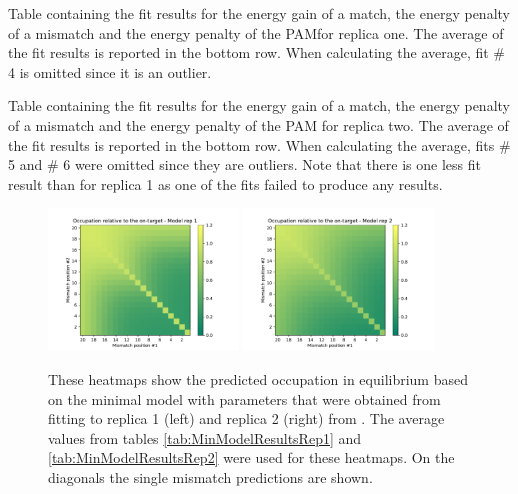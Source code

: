 \begin{table}
\begin{center}
\caption{Table containing the fit results for the energy gain of a match, the energy penalty of a mismatch and the energy penalty of the PAMfor replica one. The average of the fit results is reported in the bottom row. When calculating the average, fit \# 4 is omitted since it is an outlier.}
\label{tab:MinModelResultsRep1}
\end{center}
\end{table}

\begin{table}
\begin{center}
\caption{Table containing the fit results for the energy gain of a match, the energy penalty of a mismatch and the energy penalty of the PAM for replica two. The average of the fit results is reported in the bottom row. When calculating the average, fits \# 5 and \# 6 were omitted since they are outliers. Note that there is one less fit result than for replica 1 as one of the fits failed to produce any results. }
\label{tab:MinModelResultsRep2}
\end{center}
\end{table}

\begin{figure}
\begin{center}
\includegraphics[width=0.45\textwidth]{images/MinModelRep1}
\includegraphics[width=0.45\textwidth]{images/MinModelRep2}
\caption{These heatmaps show the predicted occupation in equilibrium based on the minimal model with parameters that were obtained from fitting to replica 1 (left) and replica 2 (right) from \cite{PNAS}. The average values from tables \ref{tab:MinModelResultsRep1} and \ref{tab:MinModelResultsRep2} were used for these heatmaps. On the diagonals the single mismatch predictions are shown. }
\label{fig:MinModelResultsHM}
\end{center}
\end{figure}

